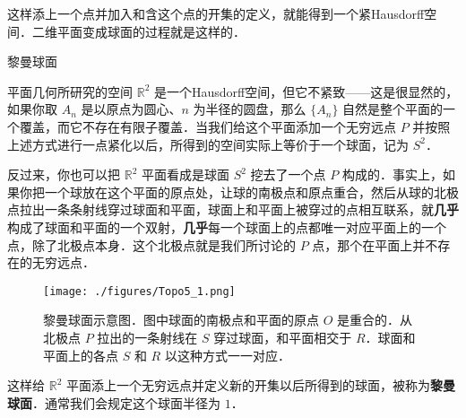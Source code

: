 这样添上一个点并加入和含这个点的开集的定义，就能得到一个紧Hausdorff空间．二维平面变成球面的过程就是这样的．

\begin{example}{黎曼球面}\label{Topo5_ex1}

平面几何所研究的空间 $\mathbb{R}^2$ 是一个Hausdorff空间，但它不紧致——这是很显然的，如果你取 $A_n$ 是以原点为圆心、$n$ 为半径的圆盘，那么 $\{A_n\}$ 自然是整个平面的一个覆盖，而它不存在有限子覆盖．当我们给这个平面添加一个无穷远点 $P$ 并按照上述方式进行一点紧化以后，所得到的空间实际上等价于一个球面，记为 $S^2$．

反过来，你也可以把 $\mathbb{R}^2$ 平面看成是球面 $S^2$ 挖去了一个点 $P$ 构成的．事实上，如果你把一个球放在这个平面的原点处，让球的南极点和原点重合，然后从球的北极点拉出一条条射线穿过球面和平面，球面上和平面上被穿过的点相互联系，就\textbf{几乎}构成了球面和平面的一个双射，\textbf{几乎}每一个球面上的点都唯一对应平面上的一个点，除了北极点本身．这个北极点就是我们所讨论的 $P$ 点，那个在平面上并不存在的无穷远点．

\begin{figure}[ht]
\centering
\texttt{[image: ./figures/Topo5\_1.png]}
\caption{黎曼球面示意图．图中球面的南极点和平面的原点 $O$ 是重合的．从北极点 $P$ 拉出的一条射线在 $S$ 穿过球面，和平面相交于 $R$．球面和平面上的各点 $S$ 和 $R$ 以这种方式一一对应．} \label{Topo5_fig1}
\end{figure}

这样给 $\mathbb{R}^2$ 平面添上一个无穷远点并定义新的开集以后所得到的球面，被称为\textbf{黎曼球面}．通常我们会规定这个球面半径为 $1$．
\end{example}



